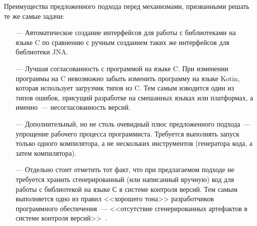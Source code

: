 Преимущества предложенного подхода перед механизмами, призванными решать те же самые задачи:
\begin{itemize}
\item[---] Автоматическое создание интерфейсов для работы с библиотеками на языке C по сравнению с ручным созданием таких же интерфейсов для библиотеки JNA.
\item[---] Лучшая согласованность с программой на языке C.
  При изменении программы на C невозможно забыть изменить программу на языке Kotin, которая использует загрузчик типов из C.
  Тем самым изводится один из типов ошибок, присущий разработке на смешанных языках или платформах, а именно~--- несогласованность версий.
\item[---] Дополнительный, но не столь очевидный плюс предложенного подхода~--- упрощение рабочего процесса программиста.
  Требуется выполнять запуск только одного компилятора, а не нескольких инструментов (генератора кода, а затем компилятора).
\item[---] Отдельно стоит отметить тот факт, что при предлагаемом подходе не требуется хранить сгенерированный (или написанный вручную) код для работы с библиотекой на языке С в системе контроля версий.
  Тем самым выполняется одно из правил <<хорошего тона>> разработчиков программного обеспечения~--- <<отсутствие сгенерированных артефактов в системе контроля версий>>~\cite{art-of-agile}.
\end{itemize}